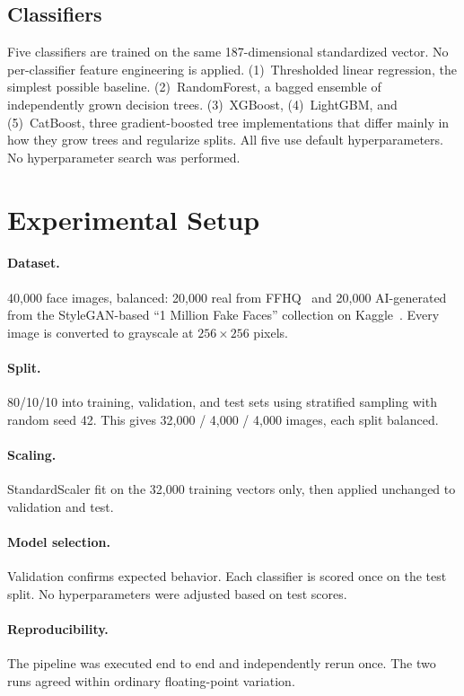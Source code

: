 \documentclass[runningheads]{llncs}
\begin{document}
\subsection{Classifiers}

Five classifiers are trained on the same 187-dimensional standardized vector. No per-classifier feature engineering is applied. (1)~Thresholded linear regression, the simplest possible baseline. (2)~RandomForest, a bagged ensemble of independently grown decision trees. (3)~XGBoost, (4)~LightGBM, and (5)~CatBoost, three gradient-boosted tree implementations that differ mainly in how they grow trees and regularize splits. All five use default hyperparameters. No hyperparameter search was performed.


\section{Experimental Setup}

\paragraph{Dataset.} 40,000 face images, balanced: 20,000 real from FFHQ~\cite{karras2019} and 20,000 AI-generated from the StyleGAN-based ``1 Million Fake Faces'' collection on Kaggle~\cite{tunguz2026}. Every image is converted to grayscale at $256 \times 256$ pixels.

\paragraph{Split.} 80/10/10 into training, validation, and test sets using stratified sampling with random seed 42. This gives 32,000 / 4,000 / 4,000 images, each split balanced.

\paragraph{Scaling.} StandardScaler fit on the 32,000 training vectors only, then applied unchanged to validation and test.

\paragraph{Model selection.} Validation confirms expected behavior. Each classifier is scored once on the test split. No hyperparameters were adjusted based on test scores.

\paragraph{Reproducibility.} The pipeline was executed end to end and independently rerun once. The two runs agreed within ordinary floating-point variation.
\end{document}

